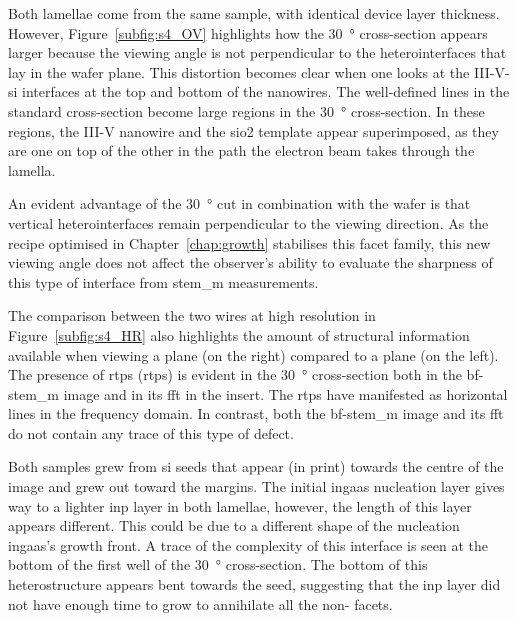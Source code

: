 Both lamellae come from the same sample, with identical device layer thickness. 
However, Figure~\ref{subfig:s4_OV} highlights how the \qty{30}{\degree} cross-section appears larger because the viewing angle is not perpendicular to the heterointerfaces that lay in the wafer plane. This distortion becomes clear when one looks at the III-V-\acs{si} interfaces at the top and bottom of the nanowires. The well-defined lines in the standard cross-section become large regions in the \qty{30}{\degree} cross-section. In these regions, the III-V nanowire and the \acs{sio2} template appear superimposed, as they are one on top of the other in the path the electron beam takes through the lamella.

An evident advantage of the \qty{30}{\degree} cut in combination with the  wafer is that vertical  heterointerfaces remain perpendicular to the viewing direction. As the recipe optimised in Chapter~\ref{chap:growth} stabilises this facet family, this new viewing angle does not affect the observer's ability to evaluate the sharpness of this type of interface from \acs{stem_m} measurements.

The comparison between the two wires at high resolution in Figure~\ref{subfig:s4_HR} also highlights the amount of structural information available when viewing a  plane (on the right) compared to a  plane (on the left). The presence of \acl{rtp}s (\acs{rtp}s) is evident in the \qty{30}{\degree} cross-section both in the \acs{bf}-\acs{stem_m} image and in its \acf{fft} in the insert. The \acs{rtp}s have manifested as horizontal lines in the frequency domain. In contrast, both the  \acs{bf}-\acs{stem_m} image and its \acf{fft} do not contain any trace of this type of defect.

Both samples grew from \acl{si} seeds that appear (in print) towards the centre of the image and grew out toward the margins. The initial \acs{ingaas} nucleation layer gives way to a lighter \acs{inp} layer in both lamellae, however, the length of this layer appears different. This could be due to a different shape of the nucleation \acs{ingaas}'s growth front. A trace of the complexity of this interface is seen at the bottom of the first well of the \qty{30}{\degree} cross-section. The bottom of this heterostructure appears bent towards the seed, suggesting that the \acs{inp} layer did not have enough time to grow to annihilate all the non- facets.

